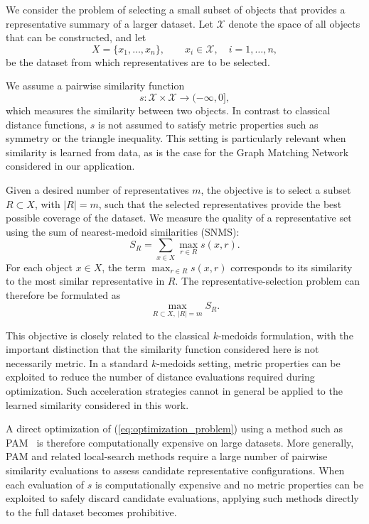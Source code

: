 \documentclass{ieeeaccess}
\newcommand{\representativeamount}{m}
\begin{document}
We consider the problem of selecting a small subset of objects that provides a representative summary of a larger dataset. Let $\mathcal{X}$ denote the space of all objects that can be constructed, and let
\[
X = \{x_1,\ldots,x_n\}, \qquad x_i \in \mathcal{X},\quad i=1,\ldots,n,
\]
be the dataset from which representatives are to be selected.

We assume a pairwise similarity function
\[
s : \mathcal{X} \times \mathcal{X} \to (-\infty,0],
\]
which measures the similarity between two objects. In contrast to classical distance functions, $s$ is not assumed to satisfy metric properties such as symmetry or the triangle inequality. This setting is particularly relevant when similarity is learned from data, as is the case for the Graph Matching Network considered in our application.

Given a desired number of representatives $\representativeamount$, the objective is to select a subset $R \subset X$, with $|R|=\representativeamount$, such that the selected representatives provide the best possible coverage of the dataset. We measure the quality of a representative set using the sum of nearest-medoid similarities (SNMS):
\begin{equation}
S_R = \sum_{x \in X} \max_{r \in R} s(x,r).
\label{eq:metric1-S_R}
\end{equation}
For each object $x \in X$, the term $\max_{r\in R}s(x,r)$ corresponds to its similarity to the most similar representative in $R$. The representative-selection problem can therefore be formulated as
\begin{equation}
\max_{R \subset X,\ |R| = \representativeamount} S_R.
\label{eq:optimization_problem}
\end{equation}

This objective is closely related to the classical $k$-medoids formulation, with the important distinction that the similarity function considered here is not necessarily metric. In a standard $k$-medoids setting, metric properties can be exploited to reduce the number of distance evaluations required during optimization. Such acceleration strategies cannot in general be applied to the learned similarity considered in this work.

A direct optimization of (\ref{eq:optimization_problem}) using a method such as PAM~\cite{kaufman1987clustering} is therefore computationally expensive on large datasets. More generally, PAM and related local-search methods require a large number of pairwise similarity evaluations to assess candidate representative configurations. When each evaluation of $s$ is computationally expensive and no metric properties can be exploited to safely discard candidate evaluations, applying such methods directly to the full dataset becomes prohibitive.
\end{document}
